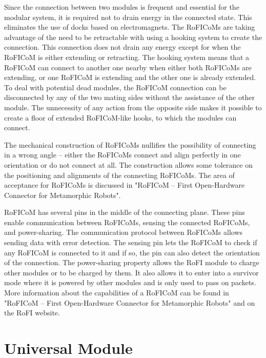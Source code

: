 \documentclass[
  printed, %
  color,   %
  notable, %
  oneside, %
  nolof,   %
  nolot,   %
  nocover,
]{fithesis3}
\begin{document}
Since the connection between two modules is frequent and essential for the modular system, it is required not to drain energy in the connected state.
This eliminates the use of docks based on electromagnets.
The RoFICoMs are taking advantage of the need to be retractable with using a hooking system to create the connection.
This connection does not drain any energy except for when the RoFICoM is either extending or retracting.
The hooking system means that a RoFICoM can connect to another one nearby when either both RoFICoMs are extending, or one RoFICoM is extending and the other one is already extended.
To deal with potential dead modules, the RoFICoM connection can be disconnected by any of the two mating sides without the assistance of the other module.
The unnecessity of any action from the opposite side makes it possible to create a floor of extended RoFICoM-like hooks, to which the modules can connect.

The mechanical construction of RoFICoMs nullifies the possibility of connecting in a wrong angle -- either the RoFICoMs connect and align perfectly in one orientation or do not connect at all.
The construction allows some tolerance on the positioning and alignments of the connecting RoFICoMs.
The area of acceptance for RoFICoMs is discussed in "RoFICoM -- First Open-Hardware Connector for Metamorphic Robots"\cite[p. 6]{roficom}.

RoFICoM has several pins in the middle of the connecting plane.
These pins enable communication between RoFICoMs, sensing the connected RoFICoMs, and power-sharing.
The communication protocol between RoFICoMs allows sending data with error detection.
The sensing pin lets the RoFICoM to check if any RoFICoM is connected to it and if so, the pin can also detect the orientation of the connection.
The power-sharing property allows the RoFI module to charge other modules or to be charged by them.
It also allows it to enter into a survivor mode where it is powered by other modules and is only used to pass on packets.
More information about the capabilities of a RoFICoM can be found in "RoFICoM -- First Open-Hardware Connector for Metamorphic Robots"\cite{roficom} and on the RoFI website\cite{rofi-web}.

\section{Universal Module}
\label{univ-module}
\end{document}
